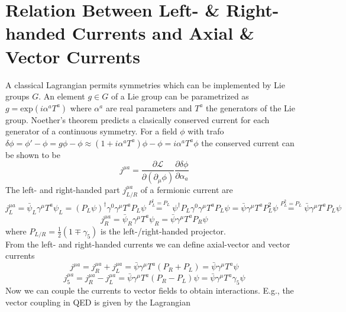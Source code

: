 \section{Relation Between Left- \& Right-handed Currents and Axial \& Vector Currents}
\label{app:Currents}
A classical Lagrangian permits symmetries which can be implemented by Lie groups $G$. An element $g \in G$ of a Lie group can be parametrized as $g = \mathrm{exp} \left(i \alpha^a T^a \right)$ where $\alpha^a$ are real parameters and $T^a$ the generators of the Lie group. Noether's theorem predicts a clasically conserved current for each generator of a continuous symmetry. For a field $\phi$ with trafo $\delta\phi = \phi' - \phi = g \phi - \phi \approx \left( 1 + i \alpha^a T^a \right) \phi - \phi = i \alpha^a T^a \phi$ the conserved current can be shown to be
\begin{equation*}
j^{\mu a} = \frac{\partial \mathcal{L}}{\partial \left( \partial_{\mu} \phi \right)} \frac{\partial \delta\phi}{\partial \alpha_a}
\end{equation*} 
The left- and right-handed part $j^{\mu a}_{L/R}$ of a fermionic current are
\begin{equation*}
j^{\mu a}_L = \bar{\psi}_L \gamma^{\mu} T^a \psi_L = \left( P_L \psi \right)^{\dagger} \gamma^0 \gamma^{\mu} T^a P_L \psi \overset{P_L^{\dagger}=P_L}{=} \psi^{\dagger} P_L \gamma^0 \gamma^{\mu} T^a P_L \psi = \bar{\psi} \gamma^{\mu} T^a P_L^2 \psi \overset{P_L^2 = P_L}{=} \bar{\psi} \gamma^{\mu} T^a P_L \psi
\end{equation*}
\begin{equation*}
j^{\mu a}_R = \bar{\psi}_R \gamma^{\mu} T^a \psi_R = \bar{\psi} \gamma^{\mu} T^a P_R \psi
\end{equation*}
where $P_{L/R} = \frac{1}{2} \left( 1 \mp \gamma_5 \right)$ is the left-/right-handed projector. \\
From the left- and right-handed currents we can define axial-vector and vector currents
\begin{equation*}
j^{\mu a} = j^{\mu a}_R + j^{\mu a}_L = \bar{\psi} \gamma^{\mu} T^a \left( P_R + P_L \right) = \bar{\psi} \gamma^{\mu} T^a \psi
\end{equation*}
\begin{equation*}
j^{\mu a}_5 = j^{\mu a}_R - j^{\mu a}_L = \bar{\psi} \gamma^{\mu} T^a \left( P_R - P_L \right) \psi = \bar{\psi} \gamma^{\mu} T^a \gamma_5 \psi
\end{equation*}
Now we can couple the currents to vector fields to obtain interactions. E.g., the vector coupling in QED is given by the Lagrangian
